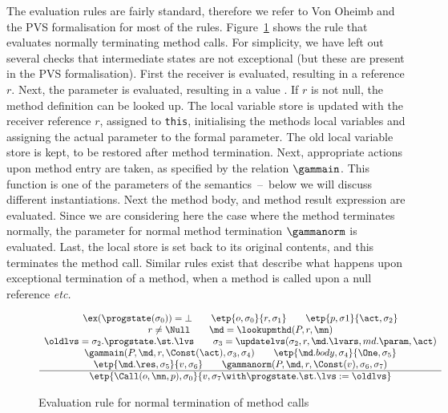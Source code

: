 The evaluation rules are fairly standard, therefore we refer to Von
Oheimb and the PVS formalisation for most of the
rules. Figure~\ref{FigEvalRules} shows the rule that evaluates
normally terminating method calls. For simplicity, we have left out
several checks that intermediate states are not exceptional (but these
are present in the PVS formalisation). First the receiver is
evaluated, resulting in a reference \(r\). Next, the parameter is
evaluated, resulting in a value \act. If \(r\) is not null, the method
definition \md can be looked up. The local variable store is updated
with the receiver reference \(r\), assigned to \texttt{this},
initialising the methods local variables and assigning the actual
parameter to the formal parameter. The old local variable store is
kept, to be restored after method termination. Next, appropriate
actions upon method entry are taken, as specified by the relation
\(\gammain\). This function is one of the parameters of the
semantics~--~below we will discuss different instantiations. Next the
method body, and method result expression are evaluated. Since we are
considering here the case where the method terminates normally, the
parameter for normal method termination \(\gammanorm\) is
evaluated. Last, the local store is set back to its original contents,
and this terminates the method call. Similar rules exist that describe
what happens upon exceptional termination of a method, when a method
is called upon a null reference \emph{etc.}



\begin{figure}[t]
\[
\begin{array}{c}
\ex(\progstate(\sigma_0)) = \bot \qquad %
\etp{o, \sigma_0}{r,\sigma_1} \qquad      %
\etp{p, \sigma1}{\act, \sigma_2}\\          %
r \not= \Null \qquad                    %
\md = \lookupmthd(P, r, \mn) \\
\oldlvs = \sigma_2.\progstate.\st.\lvs \qquad 
\sigma_3 = \updatelvs(\sigma_2, r, \md.\lvars, md.\param, \act) \\
\gammain(P, \md, r, \Const(\act), \sigma_3, \sigma_4) \qquad
\etp{\md.body, \sigma_4}{\One,\sigma_5} \\
\etp{\md.\res, \sigma_5}{v,\sigma_6}\qquad
\gammanorm(P, \md, r, \Const(v), \sigma_6, \sigma_7)\\
\hline
\etp{\Call(o,\mn,p), \sigma_0}{v, \sigma_7 \with
\progstate.\st.\lvs := \oldlvs}
\end{array}
\]
\caption{Evaluation rule for normal termination of method
calls}\label{FigEvalRules} 
\end{figure}

